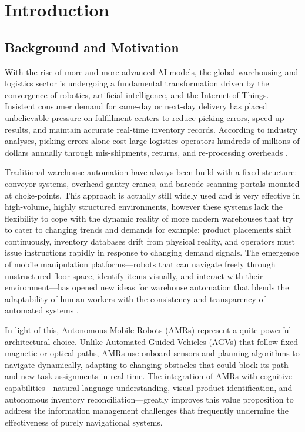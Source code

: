 \documentclass[12pt,a4paper]{report}
\begin{document}
\chapter{Introduction}
\label{ch:intro}

\section{Background and Motivation}

With the rise of more and more advanced AI models, the global warehousing and logistics sector is undergoing a fundamental transformation driven by the convergence of robotics, artificial intelligence, and the Internet of Things. Insistent consumer demand for same-day or next-day delivery has placed unbelievable pressure on fulfillment centers to reduce picking errors, speed up results, and maintain accurate real-time inventory records. According to industry analyses, picking errors alone cost large logistics operators hundreds of millions of dollars annually through mis-shipments, returns, and re-processing overheads \citep{mckinseywarehouse2022}.

Traditional warehouse automation have always been build with a fixed structure: conveyor systems, overhead gantry cranes, and barcode-scanning portals mounted at choke-points. This approach is actually still widely used and is very effective in high-volume, highly structured environments, however these systems lack the flexibility to cope with the dynamic reality of more modern warehouses that try to cater to changing trends and demands for example: product placements shift continuously, inventory databases drift from physical reality, and operators must issue instructions rapidly in response to changing demand signals. The emergence of mobile manipulation platforms—robots that can navigate freely through unstructured floor space, identify items visually, and interact with their environment—has opened new ideas for warehouse automation that blends the adaptability of human workers with the consistency and transparency of automated systems \citep{fragapane2021}.

In light of this, Autonomous Mobile Robots (AMRs) represent a quite powerful architectural choice. Unlike Automated Guided Vehicles (AGVs) that follow fixed magnetic or optical paths, AMRs use onboard sensors and planning algorithms to navigate dynamically, adapting to changing obstacles that could block its path and new task assignments in real time. The integration of AMRs with cognitive capabilities—natural language understanding, visual product identification, and autonomous inventory reconciliation—greatly improves this value proposition to address the information management challenges that frequently undermine the effectiveness of purely navigational systems.
\end{document}
